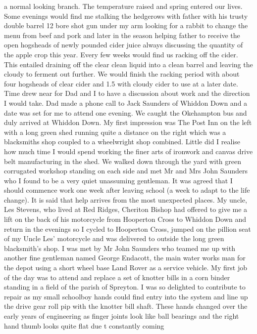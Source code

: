a normal looking branch. The temperature raised and spring entered our lives.
Some evenings would find me stalking the hedgerows with father with his trusty
double barrel 12 bore shot gun under my arm looking for a rabbit to change the
menu from beef and pork and later in the season helping father to receive the
open hogsheads of newly pounded cider juice always discussing the quantity of
the apple crop this year. Every few weeks would find us racking off the cider.
This entailed draining off the clear clean liquid into a clean barrel and
leaving the cloudy to ferment out further. We would finish the racking period
with about four hogsheads of clear cider and 1.5 with cloudy cider to use at a
later date. Time drew near for Dad and I to have a discussion about work and
the direction I would take. Dad made a phone call to Jack Saunders of Whiddon
Down and a date was set for me to attend one evening. We caught the Okehampton
bus and duly arrived at Whiddon Down. My first impression was The Post Inn on
the left with a long green shed running quite a distance on the right which was
a blacksmiths shop coupled to a wheelwright shop combined. Little did I
realise how much time I would spend working the finer arts of ironwork and
canvas drive belt manufacturing in the shed. We walked down through the yard
with green corrugated workshop standing on each side and met Mr and Mrs John
Saunders who I found to be a very quiet unassuming gentleman. It was agreed
that I should commence work one week after leaving school (a week to adapt to
the life change). It is said that help arrives from the most unexpected
places. My uncle, Les Stevens, who lived at Red Ridges, Cheriton Bishop had
offered to give me a lift on the back of his motorcycle from Hooperton Cross to
Whiddon Down and return in the evenings so I cycled to Hooperton Cross, jumped
on the pillion seat of my Uncle Les' motorcycle and was delivered to outside
the long green blacksmith's shop. I was met by Mr John Saunders who teamed me
up with another fine gentleman named George Endacott, the main water works man
for the depot using a short wheel base Land Rover as a service vehicle. My
first job of the day was to attend and replace a set of knotter bills in a corn
binder standing in a field of the parish of Spreyton. I was so delighted to
contribute to repair as my small schoolboy hands could find entry into the
system and line up the drive gear roll pip with the knotter bill shaft. These
hands changed over the early years of engineering as finger joints look like
ball bearings and the right hand thumb looks quite flat due t constantly coming
